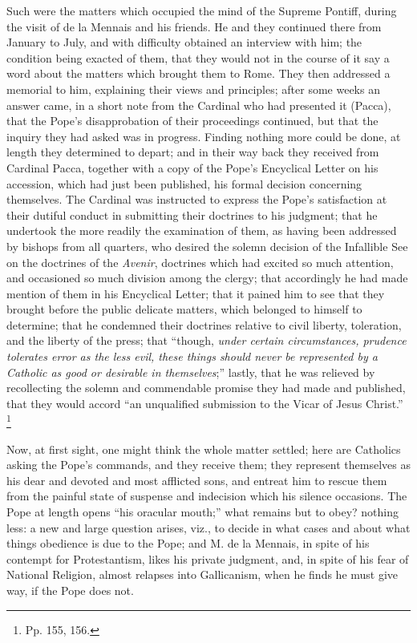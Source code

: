 Such were the matters which occupied the mind of
the Supreme Pontiff, during the visit of de la Mennais and his
friends. He and they continued there from January to July, and with
difficulty obtained an interview with him; the condition being exacted
of them, that they would not in the course of it say a word about the
matters which brought them to Rome. They then addressed a memorial to
him, explaining their views and principles; after some weeks an answer
came, in a short note from the Cardinal who had presented it (Pacca),
that the Pope's disapprobation of their proceedings continued, but
that the inquiry they had asked was in progress. Finding nothing more
could be done, at length they determined to depart; and in their way
back they received from Cardinal Pacca, together with a copy of the Pope's Encyclical Letter on his accession, which had just been
published, his formal decision concerning themselves. The Cardinal was
instructed to express the Pope's satisfaction at their dutiful conduct
in submitting their doctrines to his judgment; that he undertook the
more readily the examination of them, as having been addressed by
bishops from all quarters, who desired the solemn decision of the
Infallible See on the doctrines of the \emph{Avenir}, doctrines which
had excited so much attention, and occasioned so much division among
the clergy; that accordingly he had made mention of them in his
Encyclical Letter; that it pained him to see that they brought before
the public delicate matters, which belonged to himself to determine;
that he condemned their doctrines relative to civil liberty,
toleration, and the liberty of the press; that ``though, \emph{under
certain circumstances, prudence tolerates error as the less evil,
these things should never be represented by a Catholic as good or
desirable in themselves};'' lastly, that he was relieved by
recollecting the solemn and commendable promise they had made and
published, that they would accord ``an unqualified submission to the
Vicar of Jesus Christ.'' \footnote{Pp. 155, 156.}

Now, at first sight, one might think the whole
matter settled; here are Catholics asking the Pope's commands, and
they receive them; they represent themselves as his dear and devoted
and most afflicted sons, and entreat him to rescue them from the
painful state of suspense and indecision which his silence occasions.
The Pope at length opens ``his oracular mouth;'' what remains but to
obey? nothing less: a new and large question arises, viz., to decide
in what cases and about what things obedience is due to the Pope; and
M. de la Mennais, in spite of his contempt for Protestantism, likes
his private judgment, and, in spite of his fear of National
Religion, almost relapses into Gallicanism, when he finds he must give
way, if the Pope does not.

